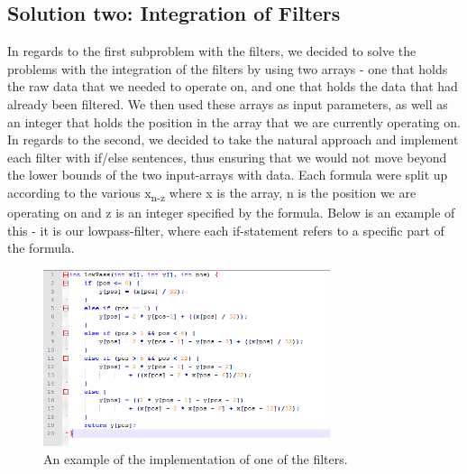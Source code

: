 \documentclass[12pt,a4paper]{article}
\begin{document}
\subsection{Solution two: Integration of Filters}
In regards to the first subproblem with the filters, we decided to solve the problems with the integration of the filters by using two arrays - one that holds the raw data that we needed to operate on, and one that holds the data that had already been filtered. We then used these arrays as input parameters, as well as an integer that holds the position in the array that we are currently operating on.\\
In regards to the second, we decided to take the natural approach and implement each filter with if/else sentences, thus ensuring that we would not move beyond the lower bounds of the two input-arrays with data. Each formula were split up according to the various x\textsubscript{n-z} where x is the array, n is the position we are operating on and z is an integer specified by the formula. Below is an example of this - it is our lowpass-filter, where each if-statement refers to a specific part of the formula.\\
\begin{figure}[h!]
  \centering
    \includegraphics[width=0.75\textwidth]{filter_example.png}
  \caption{An example of the implementation of one of the filters.}
\end{figure}
\end{document}
